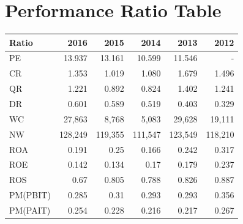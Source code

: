 \documentclass[12pt,a4paper,titlepage]{article}
\begin{document}
\appendix

\section{Performance Ratio Table}
  \begin{center}
    \begin{tabular}{lrrrrr}
      Ratio & 2016 & 2015 & 2014 & 2013 & 2012\\
      \hline
      PE & 13.937 & 13.161 & 10.599 & 11.546 & -\\
      CR & 1.353 & 1.019 & 1.080 & 1.679 & 1.496\\
      QR & 1.221 & 0.892 & 0.824 & 1.402 & 1.241\\
      DR & 0.601 & 0.589 & 0.519 & 0.403 & 0.329\\
      WC & 27,863 & 8,768 & 5,083 & 29,628 & 19,111\\
      NW & 128,249 & 119,355 & 111,547 & 123,549 & 118,210\\
      ROA & 0.191 & 0.25 & 0.166 & 0.242 & 0.317\\
      ROE & 0.142 & 0.134 & 0.17 & 0.179 & 0.237\\
      ROS & 0.67 & 0.805 & 0.788 & 0.826 & 0.887\\
      PM(PBIT) & 0.285 & 0.31 & 0.293 & 0.293 & 0.356\\
      PM(PAIT) & 0.254 & 0.228 & 0.216 & 0.217 & 0.267\\
    \end{tabular}
  \end{center}

\newpage

\printbibliography[
heading=bibintoc,
title={Resources}
]
\end{document}
